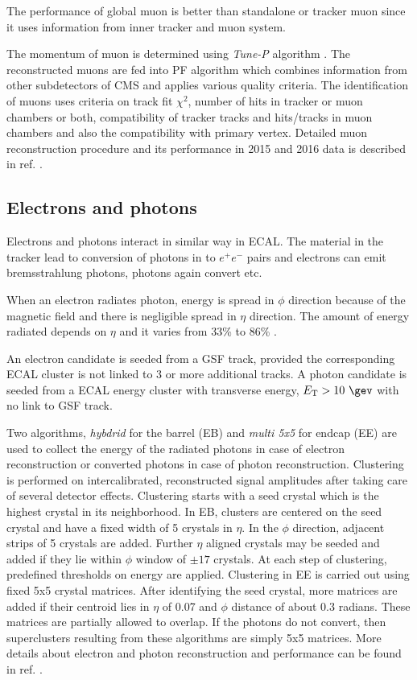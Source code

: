 The performance of global muon is better than standalone or tracker muon since it uses information from inner tracker and muon system.

The momentum of muon is determined using \textit{Tune-P} algorithm \cite{Chatrchyan:2012xi}. The reconstructed muons are fed into PF 
algorithm which combines information from other subdetectors of CMS and applies various quality criteria. The identification of muons uses 
criteria on track fit $\chi^2$, number of hits in tracker or muon chambers or both, compatibility of tracker tracks and hits/tracks in 
muon chambers and also the  compatibility with primary vertex. Detailed muon reconstruction procedure and its performance in 2015 and 2016 
data is described in ref. \cite{Sirunyan:2018fpa}.

\subsection{Electrons and photons}
Electrons and photons interact in similar way in ECAL. The material in the tracker lead to conversion of photons in to $e^+e^-$ pairs and 
electrons can emit bremsstrahlung photons, photons again convert etc.

When an electron radiates photon, energy is spread in $\phi$ direction because of the magnetic field and there is negligible spread in 
$\eta$ direction. The amount of energy radiated depends on $\eta$ and it varies from 33\% to 86\% \cite{Khachatryan:2015hwa}.

An electron candidate is seeded from a GSF track, provided the corresponding ECAL cluster is not linked to 3 or more additional tracks. A 
photon candidate is seeded from a ECAL energy cluster with transverse energy, $\et > 10\ \gev$ with no link to GSF track.

Two algorithms, \textit{hybdrid} for the barrel (EB) and \textit{multi 5x5} for endcap (EE) \cite{Khachatryan:2015hwa} are used to collect 
the energy of the radiated photons in case of electron reconstruction or converted photons in case of photon reconstruction. Clustering is 
performed  on intercalibrated, reconstructed signal amplitudes after taking care of several detector effects. Clustering starts with a 
seed crystal which is the highest \et crystal in its neighborhood. In EB, clusters are centered on the seed crystal and have a fixed width 
of 5 crystals in $\eta$. In the $\phi$ direction, adjacent strips of 5 crystals are added. Further $\eta$ aligned crystals may be seeded 
and added if they lie within $\phi$ window of $\pm17$ crystals. At each step of clustering, predefined thresholds on energy are applied. 
Clustering in EE is carried out using fixed 5x5 crystal matrices. After identifying the seed crystal, more matrices are added if their 
centroid lies in  $\eta$ of 0.07 and $\phi$ distance of about 0.3 radians. These matrices are partially allowed to overlap. If the photons 
do not convert, then superclusters resulting from these algorithms are simply 5x5 matrices. More details about electron and photon 
reconstruction and performance can be found in ref. \cite{Khachatryan:2015hwa,CMS:EGM-14-001}.

